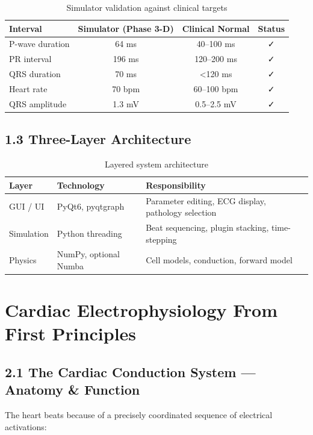 \documentclass[12pt,oneside,a4paper]{book}
\begin{document}
\begin{table}[H]
\centering
\begin{tabularx}{\textwidth}{|l|c|c|c|}
\hline
\textbf{Interval} & \textbf{Simulator (Phase 3-D)} & \textbf{Clinical Normal} & \textbf{Status} \\
\hline
P-wave duration & 64 ms & 40--100 ms & ✓ \\
PR interval & 196 ms & 120--200 ms & ✓ \\
QRS duration & 70 ms & \textless 120 ms & ✓ \\
Heart rate & 70 bpm & 60--100 bpm & ✓ \\
QRS amplitude & 1.3 mV & 0.5--2.5 mV & ✓ \\
\hline
\end{tabularx}
\caption{Simulator validation against clinical targets}
\label{tab:validation}
\end{table}

\section{1.3 Three-Layer Architecture}

\begin{table}[H]
\centering
\begin{tabularx}{\textwidth}{|l|l|X|}
\hline
\textbf{Layer} & \textbf{Technology} & \textbf{Responsibility} \\
\hline
GUI / UI & PyQt6, pyqtgraph & Parameter editing, ECG display, pathology selection \\
Simulation & Python threading & Beat sequencing, plugin stacking, time-stepping \\
Physics & NumPy, optional Numba & Cell models, conduction, forward model \\
\hline
\end{tabularx}
\caption{Layered system architecture}
\label{tab:layers}
\end{table}

\chapter{Cardiac Electrophysiology From First Principles}

\section{2.1 The Cardiac Conduction System — Anatomy \& Function}

The heart beats because of a precisely coordinated sequence of electrical activations:
\end{document}
